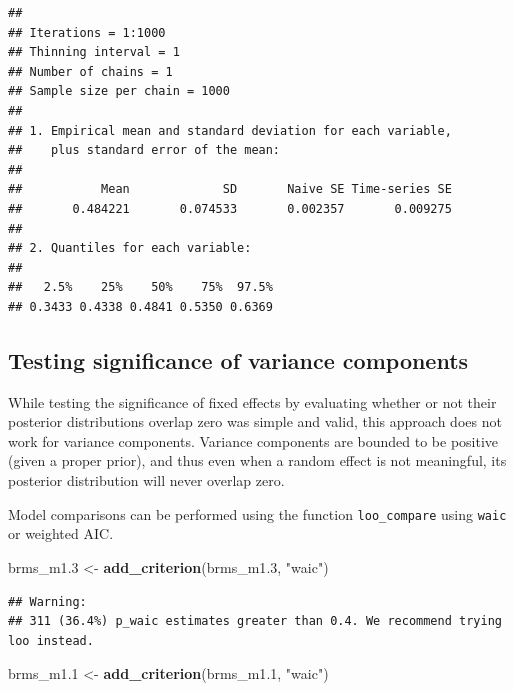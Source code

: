 \documentclass[
  12pt,
]{book}
\newenvironment{Shaded}{\begin{snugshade}}{\end{snugshade}}
\newcommand{\FloatTok}[1]{\textcolor[rgb]{0.00,0.00,0.81}{#1}}
\newcommand{\KeywordTok}[1]{\textcolor[rgb]{0.13,0.29,0.53}{\textbf{#1}}}
\newcommand{\NormalTok}[1]{#1}
\newcommand{\StringTok}[1]{\textcolor[rgb]{0.31,0.60,0.02}{#1}}
\begin{document}
\begin{verbatim}
## 
## Iterations = 1:1000
## Thinning interval = 1 
## Number of chains = 1 
## Sample size per chain = 1000 
## 
## 1. Empirical mean and standard deviation for each variable,
##    plus standard error of the mean:
## 
##           Mean             SD       Naive SE Time-series SE 
##       0.484221       0.074533       0.002357       0.009275 
## 
## 2. Quantiles for each variable:
## 
##   2.5%    25%    50%    75%  97.5% 
## 0.3433 0.4338 0.4841 0.5350 0.6369
\end{verbatim}

\hypertarget{testing-significance-of-variance-components-1}{%
\subsection{Testing significance of variance components}\label{testing-significance-of-variance-components-1}}

While testing the significance of fixed effects by evaluating whether or not their posterior distributions overlap zero was simple and valid, this approach does not work for variance components.
Variance components are bounded to be positive (given a proper prior), and thus even when a random effect is not meaningful, its posterior distribution will never overlap zero.

Model comparisons can be performed using the function \texttt{loo\_compare} using \texttt{waic} or weighted AIC.

\begin{Shaded}
\begin{Highlighting}[]
\NormalTok{brms\_m1}\FloatTok{.3}\NormalTok{ \textless{}{-}}\StringTok{ }\KeywordTok{add\_criterion}\NormalTok{(brms\_m1}\FloatTok{.3}\NormalTok{, }\StringTok{"waic"}\NormalTok{)}
\end{Highlighting}
\end{Shaded}

\begin{verbatim}
## Warning: 
## 311 (36.4%) p_waic estimates greater than 0.4. We recommend trying loo instead.
\end{verbatim}

\begin{Shaded}
\begin{Highlighting}[]
\NormalTok{brms\_m1}\FloatTok{.1}\NormalTok{ \textless{}{-}}\StringTok{ }\KeywordTok{add\_criterion}\NormalTok{(brms\_m1}\FloatTok{.1}\NormalTok{, }\StringTok{"waic"}\NormalTok{)}
\end{Highlighting}
\end{Shaded}
\end{document}
